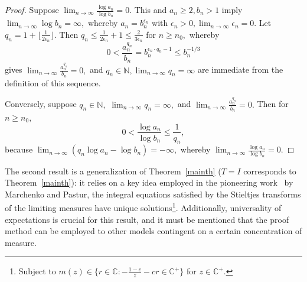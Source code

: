 \documentclass{article}
\numberwithin{equation}{section}
\begin{document}
\begin{proof}
    Suppose \(\lim_{n \to \infty}{\frac{\log{a_n}}{\log{b_n}}}=0.\) This and \(a_n \geq 2,b_n > 1\) imply \(\lim_{n \to \infty}{\log{b_n}}=\infty,\) whereby \(a_n=b_n^{\epsilon_n}\) with \(\epsilon_n>0, \lim_{n \to \infty}{\epsilon_n}=0.\) Let \(q_n=1+\lfloor \frac{1}{2\epsilon_n} \rfloor.\) Then \(q_n \leq \frac{1}{2\epsilon_n}+1 \leq \frac{2}{3\epsilon_n}\) for \(n \geq n_0,\) whereby 
    \[0<\frac{a_n^{q_n}}{b_n}= b_n^{\epsilon_n \cdot q_n-1} \leq b_n^{-1/3}\]
    gives \(\lim_{n \to \infty}{\frac{a_n^{q_n}}{b_n}}=0,\) and \(q_n \in \mathbb{N}, \lim_{n \to \infty}{q_n}=\infty\) are immediate from the definition of this sequence.
    \par
    Conversely, suppose \(q_n \in \mathbb{N},\) \(\lim_{n \to \infty}{q_n}=\infty,\) and \(\lim_{n \to \infty}{\frac{a_n^{q_n}}{b_n}}=0.\) 
    Then for \(n \geq n_0,\)
    \[0<\frac{\log{a_n}}{\log{b_n}} \leq \frac{1}{q_n},\] 
    because \(\lim_{n \to \infty}{(q_n\log{a_n}-\log{b_n})}=-\infty,\) 
    whereby \(\lim_{n \to \infty}{\frac{\log{a_n}}{\log{b_n}}}=0.\)
\end{proof}


The second result is a generalization of Theorem~\ref{mainth} (\(T=I\) corresponds to Theorem~\ref{mainth}): it relies on a key idea employed in the pioneering work~\cite{marchenkopastur} by Marchenko and Pastur, the integral equations satisfied by the Stieltjes transforms of the limiting measures have unique solutions\footnote{Subject to \(m(z) \in \{r \in \mathbb{C}: -\frac{1-c}{z}-cr \in \mathbb{C}^{+}\}\) for \(z \in \mathbb{C}^+.\)}.
Additionally, universality of expectations is crucial for this result, and it must be mentioned that the proof method can be employed to other models contingent on a certain concentration of measure.

\end{document}
